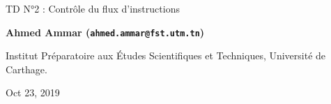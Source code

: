 \documentclass[%
oneside,                 %
final,                   %
10pt,french]{article}
\begin{document}

\newcommand{\exercisesection}[1]{\subsection*{#1}}






\thispagestyle{empty}

\begin{center}
{\LARGE\bf
\begin{spacing}{1.25}
TD N°2 : Contrôle du flux d’instructions
\end{spacing}
}
\end{center}


\begin{center}
{\bf Ahmed Ammar (\texttt{ahmed.ammar@fst.utm.tn})}
\end{center}

    \begin{center}
\centerline{{\small Institut Préparatoire aux Études Scientifiques et Techniques, Université de Carthage.}}
\end{center}
    

\begin{center}
Oct 23, 2019
\end{center}

\vspace{1cm}


\tableofcontents


\vspace{1cm} %
\end{document}
